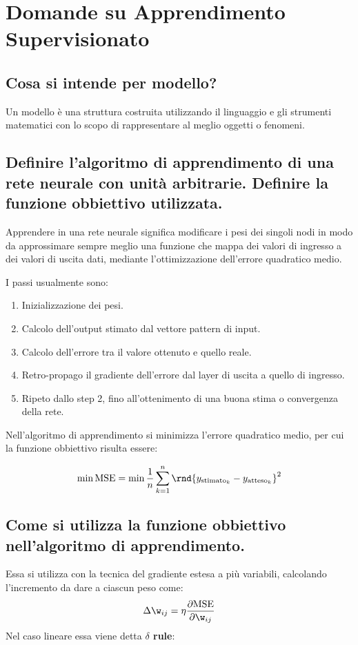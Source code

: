\documentclass[\main/main.tex]{subfiles}
\begin{document}
\section{Domande su Apprendimento Supervisionato}
\subsection{Cosa si intende per modello?}
Un modello è una struttura costruita utilizzando il linguaggio e gli strumenti matematici con lo scopo di rappresentare al meglio oggetti o fenomeni.

\subsection{Definire l'algoritmo di apprendimento di una rete neurale con unità arbitrarie. Definire la funzione obbiettivo utilizzata.}
Apprendere in una rete neurale significa modificare i pesi dei singoli nodi in modo da approssimare sempre meglio una funzione che mappa dei valori di ingresso a dei valori di uscita dati, mediante l'ottimizzazione dell'errore quadratico medio.

I passi usualmente sono:
\begin{enumerate}
  \item Inizializzazione dei pesi.
  \item Calcolo dell'output stimato dal vettore pattern di input.
  \item Calcolo dell'errore tra il valore ottenuto e quello reale.
  \item Retro-propago il gradiente dell'errore dal layer di uscita a quello di ingresso.
  \item Ripeto dallo step 2, fino all'ottenimento di una buona stima o convergenza della rete.
\end{enumerate}

Nell'algoritmo di apprendimento si minimizza l'errore quadratico medio, per cui la funzione obbiettivo risulta essere:

\[
  \min \text{MSE} = \min \frac{1}{n}\sum_{k=1}^n \rnd{y_{\text{stimato}_k} - y_{\text{atteso}_k}}^2
\]

\subsection{Come si utilizza la funzione obbiettivo nell'algoritmo di apprendimento.}
Essa si utilizza con la tecnica del gradiente estesa a più variabili, calcolando l'incremento da dare a ciascun peso come:
\[
  \Delta \w_{ij} = \eta \frac{\partial \text{MSE}}{\partial{\w_{ij}}}
\]
Nel caso lineare essa viene detta \textbf{$\delta$ rule}:
\end{document}
